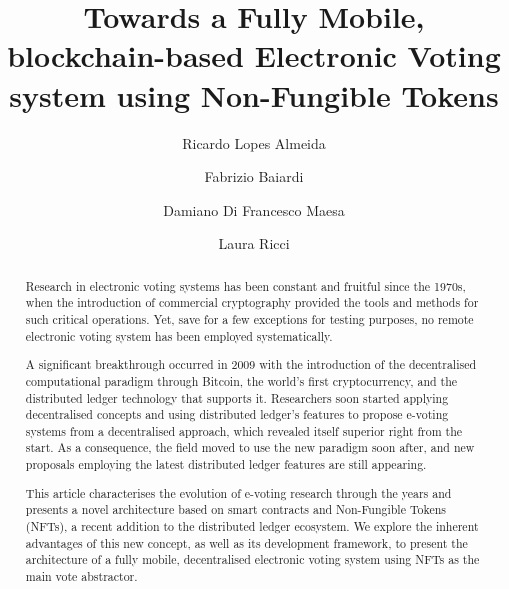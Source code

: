 \documentclass[10pt]{article}
\author[1]{Ricardo Lopes Almeida}
\author[2]{Fabrizio Baiardi}
\author[3]{Damiano Di Francesco Maesa}
\author[4]{Laura Ricci}
\affil[1, 2, 3, 4]{Dipartimento di Informatica, Università di Pisa, Italia}
\affil[1]{Università di Camerino, Italia}
\title{Towards a Fully Mobile, blockchain-based Electronic Voting system using Non-Fungible Tokens}
\begin{document}
\maketitle

\begin{abstract}
    Research in electronic voting systems has been constant and fruitful since the 1970s, when the introduction of commercial cryptography provided the tools and methods for such critical operations. Yet, save for a few exceptions for testing purposes, no remote electronic voting system has been employed systematically.
    \par
    A significant breakthrough occurred in 2009 with the introduction of the decentralised computational paradigm through Bitcoin, the world's first cryptocurrency, and the distributed ledger technology that supports it. Researchers soon started applying decentralised concepts and using distributed ledger's features to propose e-voting systems from a decentralised approach, which revealed itself superior right from the start. As a consequence, the field moved to use the new paradigm soon after, and new proposals employing the latest distributed ledger features are still appearing.
    \par
    This article characterises the evolution of e-voting research through the years and presents a novel architecture based on smart contracts and Non-Fungible Tokens (NFTs), a recent addition to the distributed ledger ecosystem. We explore the inherent advantages of this new concept, as well as its development framework, to present the architecture of a fully mobile, decentralised electronic voting system using NFTs as the main vote abstractor.
\end{abstract}

















\printbibliography

\listoftodos
\end{document}
